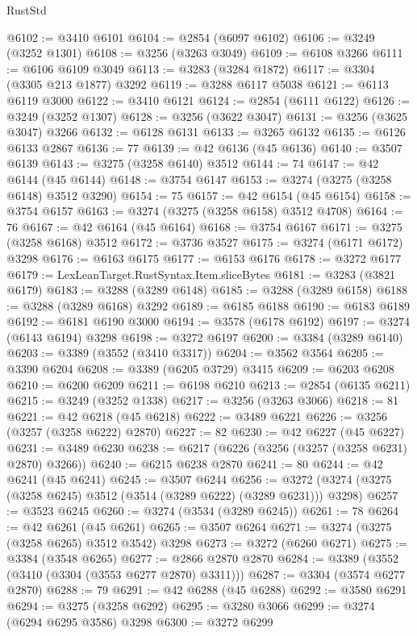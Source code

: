\begin{lexlean}{RustStd}
\begin{coremodule}
@6102 := @3410 @6101
@6104 := @2854 (@6097 @6102)
@6106 := @3249 (@3252 @1301)
@6108 := @3256 (@3263 @3049)
@6109 := @6108 @3266
@6111 := @6106 @6109 @3049
@6113 := @3283 (@3284 @1872)
@6117 := @3304 (@3305 @213 @1877) @3292
@6119 := @3288 @6117 @5038
@6121 := @6113 @6119 @3000
@6122 := @3410 @6121
@6124 := @2854 (@6111 @6122)
@6126 := @3249 (@3252 @1307)
@6128 := @3256 (@3622 @3047)
@6131 := @3256 (@3625 @3047) @3266
@6132 := @6128 @6131
@6133 := @3265 @6132
@6135 := @6126 @6133 @2867
@6136 := 77
@6139 := @42 @6136 (@45 @6136)
@6140 := @3507 @6139
@6143 := @3275 (@3258 @6140) @3512
@6144 := 74
@6147 := @42 @6144 (@45 @6144)
@6148 := @3754 @6147
@6153 := @3274 (@3275 (@3258 @6148) @3512 @3290)
@6154 := 75
@6157 := @42 @6154 (@45 @6154)
@6158 := @3754 @6157
@6163 := @3274 (@3275 (@3258 @6158) @3512 @4708)
@6164 := 76
@6167 := @42 @6164 (@45 @6164)
@6168 := @3754 @6167
@6171 := @3275 (@3258 @6168) @3512
@6172 := @3736 @3527
@6175 := @3274 (@6171 @6172) @3298
@6176 := @6163 @6175
@6177 := @6153 @6176
@6178 := @3272 @6177
@6179 := LexLeanTarget.RustSyntax.Item.sliceBytes
@6181 := @3283 (@3821 @6179)
@6183 := @3288 (@3289 @6148)
@6185 := @3288 (@3289 @6158)
@6188 := @3288 (@3289 @6168) @3292
@6189 := @6185 @6188
@6190 := @6183 @6189
@6192 := @6181 @6190 @3000
@6194 := @3578 (@6178 @6192)
@6197 := @3274 (@6143 @6194) @3298
@6198 := @3272 @6197
@6200 := @3384 (@3289 @6140)
@6203 := @3389 (@3552 (@3410 @3317))
@6204 := @3562 @3564
@6205 := @3390 @6204
@6208 := @3389 (@6205 @3729) @3415
@6209 := @6203 @6208
@6210 := @6200 @6209
@6211 := @6198 @6210
@6213 := @2854 (@6135 @6211)
@6215 := @3249 (@3252 @1338)
@6217 := @3256 (@3263 @3066)
@6218 := 81
@6221 := @42 @6218 (@45 @6218)
@6222 := @3489 @6221
@6226 := @3256 (@3257 (@3258 @6222) @2870)
@6227 := 82
@6230 := @42 @6227 (@45 @6227)
@6231 := @3489 @6230
@6238 := @6217 (@6226 (@3256 (@3257 (@3258 @6231) @2870) @3266))
@6240 := @6215 @6238 @2870
@6241 := 80
@6244 := @42 @6241 (@45 @6241)
@6245 := @3507 @6244
@6256 := @3272 (@3274 (@3275 (@3258 @6245) @3512 (@3514 (@3289 @6222) (@3289 @6231))) @3298)
@6257 := @3523 @6245
@6260 := @3274 (@3534 (@3289 @6245))
@6261 := 78
@6264 := @42 @6261 (@45 @6261)
@6265 := @3507 @6264
@6271 := @3274 (@3275 (@3258 @6265) @3512 @3542) @3298
@6273 := @3272 (@6260 @6271)
@6275 := @3384 (@3548 @6265)
@6277 := @2866 @2870 @2870
@6284 := @3389 (@3552 (@3410 (@3304 (@3553 @6277 @2870) @3311)))
@6287 := @3304 (@3574 @6277 @2870)
@6288 := 79
@6291 := @42 @6288 (@45 @6288)
@6292 := @3580 @6291
@6294 := @3275 (@3258 @6292)
@6295 := @3280 @3066
@6299 := @3274 (@6294 @6295 @3586) @3298
@6300 := @3272 @6299

\end{coremodule}
\end{lexlean}
